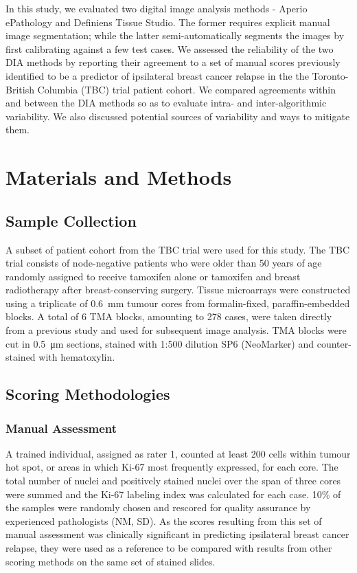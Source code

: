 \documentclass[final,5p,times,twocolumn]{elsarticle}
\begin{document}
In this study, we evaluated two digital image analysis methods - Aperio ePathology and Definiens Tissue Studio. The former requires explicit manual image segmentation; while the latter semi-automatically segments the images by first calibrating against a few test cases. We assessed the reliability of the two DIA methods by reporting their agreement to a set of manual scores previously identified to be a predictor of ipsilateral breast cancer relapse in the the Toronto-British Columbia (TBC) trial patient cohort. \cite{Liu2015} We compared agreements within and between the DIA methods so as to evaluate intra- and inter-algorithmic variability. We also discussed potential sources of variability and ways to mitigate them.

\section*{Materials and Methods}

\subsection*{Sample Collection}
A subset of patient cohort from the TBC trial were used for this study. \cite{Liu2015} The TBC trial consists of node-negative patients who were older than 50 years of age randomly assigned to receive tamoxifen alone or tamoxifen and breast radiotherapy after breast-conserving surgery. \cite{Fyles2009} Tissue microarrays were constructed using a triplicate of \SI{0.6}{\milli\metre} tumour cores from formalin-fixed, paraffin-embedded blocks. A total of 6 TMA blocks, amounting to 278 cases, were taken directly from a previous study and used for subsequent image analysis. \cite{Liu2015} TMA blocks were cut in \SI{0.5}{\micro\metre} sections, stained with 1:500 dilution SP6 (NeoMarker) and counter-stained with hematoxylin.

\subsection*{Scoring Methodologies}

\subsubsection*{Manual Assessment}
A trained individual, assigned as rater 1, counted at least 200 cells within tumour hot spot, or areas in which Ki-67 most frequently expressed, for each core. The total number of nuclei and positively stained nuclei over the span of three cores were summed and the Ki-67 labeling index was calculated for each case. 10\% of the samples were randomly chosen and rescored for quality assurance by experienced pathologists (NM, SD). As the scores resulting from this set of manual assessment was clinically significant in predicting ipsilateral breast cancer relapse, they were used as a reference to be compared with results from other scoring methods on the same set of stained slides.
\end{document}
